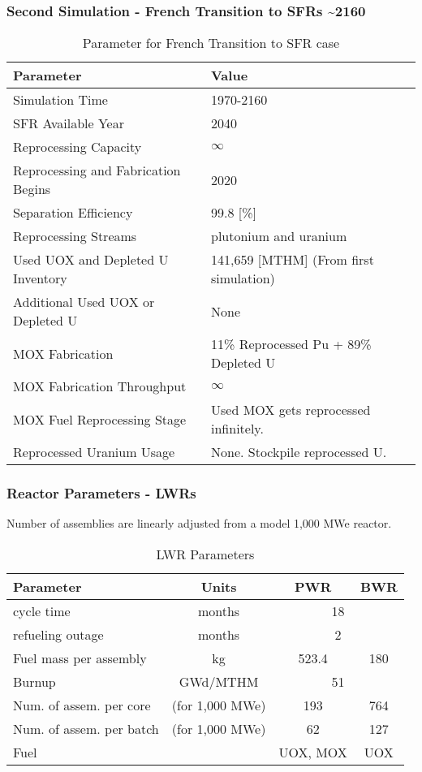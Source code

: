 \begin{frame}
	\frametitle{Second Simulation - French Transition to SFRs \textasciitilde 2160}
	
\begin{table}[h]
	\centering
	\begin{tabularx}{\textwidth}{bb}
		\hline
		Parameter & Value \\
		\hline
		Simulation Time & 1970-2160 \\
		\gls{SFR} Available Year & 2040 \\
		Reprocessing Capacity & $\infty$ \\
		Reprocessing and Fabrication Begins & 2020 \\
		Separation Efficiency & 99.8 [\%] \\
		Reprocessing Streams & plutonium and uranium \\
		\small{Used \gls{UOX} and Depleted U Inventory} & 141,659 [MTHM] {\small (From first simulation)} \\
		\small{Additional Used \gls{UOX} or Depleted U} & None  \\
		\gls{MOX} Fabrication &  \small{11\% Reprocessed Pu + 89\% Depleted U}  \\
		\gls{MOX} Fabrication Throughput & $\infty$ \\
		\gls{MOX} Fuel Reprocessing Stage &  Used \gls{MOX} gets reprocessed infinitely. \\
		Reprocessed Uranium Usage &  None. Stockpile reprocessed U. \\
		\hline
	\end{tabularx}
	\caption {Parameter for French Transition to \gls{SFR} case }
	\label{tab:sim_france}
\end{table}

\end{frame}


\begin{frame}
	\frametitle{Reactor Parameters - \glspl{LWR} }
	Number of assemblies are linearly adjusted from a model 1,000 MWe reactor.
	\begin{table}[h]
    \centering
    \begin{tabularx}{\textwidth}{bccc}
        \hline
        Parameter & Units & PWR & BWR \\
        \hline
        cycle time & months & \multicolumn{2}{c}{18}   \\ 
        refueling outage & months & \multicolumn{2}{c}{2}\\
        Fuel mass per assembly & kg & 523.4 & 180 \\
        Burnup & GWd/MTHM & \multicolumn{2}{c}{51} \\
        \small{Num. of assem. per core} & (for 1,000 MWe) & 193  & 764 \\
        \small{Num. of assem. per batch} & (for 1,000 MWe) & 62 & 127 \\
        Fuel & & \gls{UOX}, \gls{MOX} & \gls{UOX}  \\
        \hline
    \end{tabularx}
    \caption {\gls{LWR} Parameters}
    \label{tab:lwr}
    \end{table}
\end{frame}


